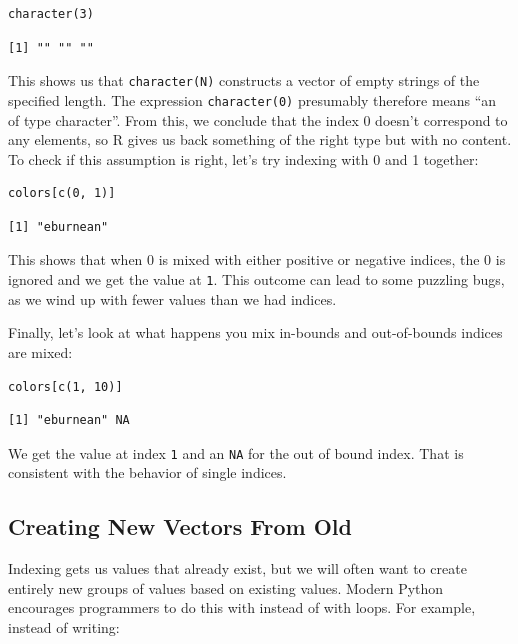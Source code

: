 \begin{lstlisting}
character(3)
\end{lstlisting}

\begin{lstlisting}
[1] "" "" ""
\end{lstlisting}

This shows us that 
\texttt{character(N)} constructs a vector of empty strings of the specified length.
The expression \texttt{character(0)} presumably therefore means
``an  of type character''.
From this,
we conclude that the index 0 doesn't correspond to any elements,
so R gives us back something of the right type but with no content.
To check if this assumption is right,
let's try indexing with 0 and 1 together:

\begin{lstlisting}
colors[c(0, 1)]
\end{lstlisting}

\begin{lstlisting}
[1] "eburnean"
\end{lstlisting}

This shows that when 0 is mixed with either positive or negative indices,
the 0 is ignored and we get the value at \lstinline{1}.
This outcome can  lead to some puzzling bugs,
as we wind up with fewer values than we had indices.

Finally,
let's look at what happens you mix in-bounds and out-of-bounds indices are mixed:

\begin{lstlisting}
colors[c(1, 10)]
\end{lstlisting}

\begin{lstlisting}
[1] "eburnean" NA        
\end{lstlisting}

We get the value at index \lstinline{1} and an \texttt{NA} for the out of bound index.
That is consistent with the behavior of single indices.

\subsection{Creating New Vectors From Old}

Indexing gets us values that already exist,
but we will often want to create entirely new groups of values based on existing values.
Modern Python encourages programmers to do this with 
instead of with loops.
For example,
instead of writing:

